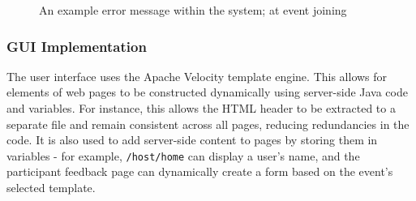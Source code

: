 \documentclass[9pt, titlepage]{extarticle}
\begin{document}
\begin{figure}[H]
    \centering
    \caption{An example error message within the system; at event joining}%
    \label{fig:error-message}%
\end{figure}

\subsubsection{GUI Implementation}

The user interface uses the Apache Velocity template engine. This allows for elements of web pages to be constructed dynamically using server-side Java code and variables. For instance, this allows the HTML header to be extracted to a separate file and remain consistent across all pages, reducing redundancies in the code. It is also used to add server-side content to pages by storing them in variables - for example, \texttt{/host/home} can display a user's name, and the participant feedback page can dynamically create a form based on the event's selected template.\\%
\end{document}
